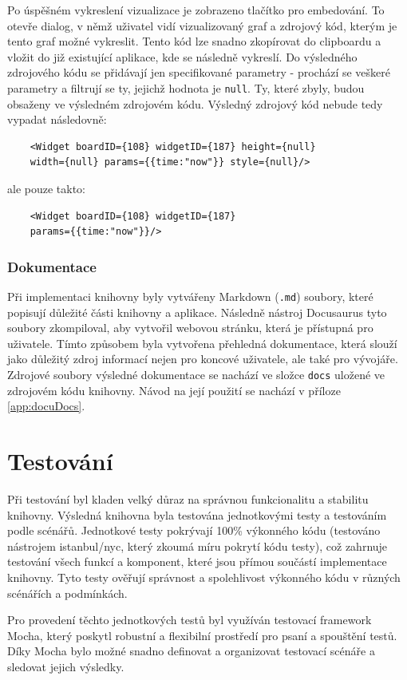 \documentclass[czech, bc, kiv, he, iso690numb]{fasthesis}
\begin{document}
Po úspěšném vykreslení vizualizace je zobrazeno tlačítko pro embedování. To otevře dialog, v němž uživatel vidí vizualizovaný graf a zdrojový kód, kterým je tento graf možné vykreslit.
Tento kód lze snadno zkopírovat do clipboardu a vložit do již existující aplikace, kde se následně vykreslí. Do výsledného zdrojového kódu se přidávají jen specifikované parametry -
prochází se veškeré parametry a filtrují se ty, jejichž hodnota je \texttt{null}. Ty, které zbyly, budou obsaženy ve výsledném zdrojovém kódu. Výsledný zdrojový kód nebude tedy vypadat následovně:
\begin{lstlisting}
	<Widget boardID={108} widgetID={187} height={null}
	width={null} params={{time:"now"}} style={null}/>
\end{lstlisting}
ale pouze takto:
\begin{lstlisting}
	<Widget boardID={108} widgetID={187} 
	params={{time:"now"}}/>
\end{lstlisting}

\subsection{Dokumentace}

Při implementaci knihovny byly vytvářeny Markdown (\texttt{.md}) soubory, které popisují důležité části knihovny a aplikace. Následně nástroj Docusaurus tyto soubory zkompiloval,
aby vytvořil webovou stránku, která je přístupná pro uživatele. Tímto způsobem byla vytvořena přehledná dokumentace, která slouží jako důležitý zdroj informací nejen pro koncové uživatele,
ale také pro vývojáře. Zdrojové soubory výsledné dokumentace se nachází ve složce \texttt{docs} uložené ve zdrojovém kódu knihovny. Návod na její použití se nachází v příloze \ref{app:docuDocs}.

\chapter{Testování}
Při testování byl kladen velký důraz na správnou funkcionalitu a stabilitu knihovny. Výsledná knihovna byla testována jednotkovými testy a testováním podle
scénářů. Jednotkové testy pokrývají 100\% výkonného kódu (testováno nástrojem istanbul/nyc, který zkoumá míru pokrytí kódu testy), což zahrnuje testování všech funkcí a komponent, 
které jsou přímou součástí implementace knihovny.
Tyto testy ověřují správnost a spolehlivost výkonného kódu v různých scénářích a podmínkách.

Pro provedení těchto jednotkových testů byl využíván testovací framework Mocha, který poskytl robustní a flexibilní prostředí pro psaní a spouštění testů. 
Díky Mocha bylo možné snadno definovat a organizovat testovací scénáře a sledovat jejich výsledky.
\end{document}

